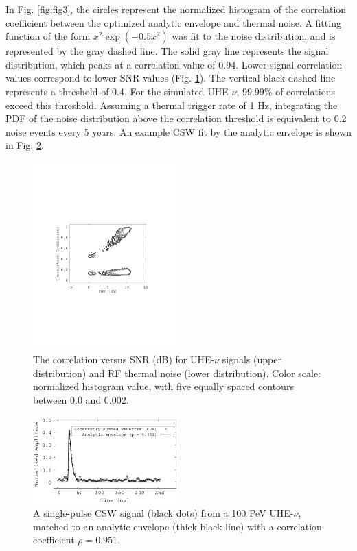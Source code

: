 \documentclass[amsmath,amssymb,aps,prd,10pt,twocolumn,showkeys]{revtex4}
\begin{document}
In Fig. \ref{fig:fig3}, the circles represent the normalized histogram of the correlation coefficient between the optimized analytic envelope and thermal noise.  A fitting function of the form $x^2 \exp(-0.5 x^2)$ was fit to the noise distribution, and is represented by the gray dashed line.  The solid gray line represents the signal distribution, which peaks at a correlation value of 0.94.  Lower signal correlation values correspond to lower SNR values (Fig. \ref{fig:fig4}).  The vertical black dashed line represents a threshold of 0.4.  For the simulated UHE-$\nu$, 99.99\% of correlations exceed this threshold.  Assuming a thermal trigger rate of 1 Hz, integrating the PDF of the noise distribution above the correlation threshold is equivalent to 0.2 noise events every 5 years.  An example CSW fit by the analytic envelope is shown in Fig. \ref{fig:example_waveforms}.

\begin{figure}
\centering
\includegraphics[width=0.5\textwidth,trim=3.25cm 8.25cm 4.5cm 9.0cm,clip=true]{Aug15_plot2.pdf}
\caption{\label{fig:fig4} The correlation versus SNR (dB) for UHE-$\nu$ signals (upper distribution) and RF thermal noise (lower distribution).  Color scale: normalized histogram value, with five equally spaced contours between 0.0 and 0.002.}
\end{figure}

\begin{figure}
\centering
\includegraphics[width=0.5\textwidth]{Sept25_plot1.pdf}
\caption{\label{fig:example_waveforms} A single-pulse CSW signal (black dots) from a 100 PeV UHE-$\nu$, matched to an analytic envelope (thick black line) with a correlation coefficient $\rho = 0.951$.}
\end{figure}
\end{document}
